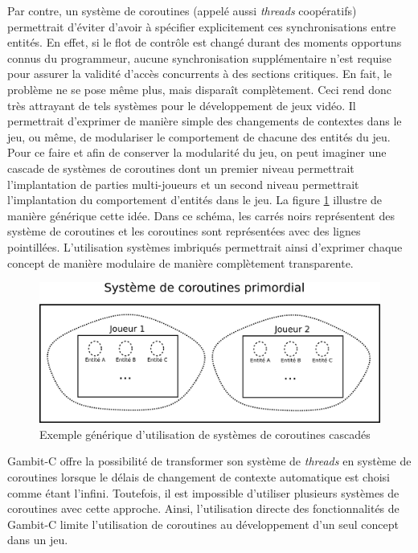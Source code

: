 \documentclass[12pt,twoside,letterpaper,francais]{book}
\begin{document}
Par contre, un système de coroutines (appelé aussi \textit{threads}
coopératifs) permettrait d'éviter d'avoir à spécifier explicitement
ces synchronisations entre entités. En effet, si le flot de contrôle
est changé durant des moments opportuns connus du programmeur, aucune
synchronisation supplémentaire n'est requise pour assurer la validité
d'accès concurrents à des sections critiques. En fait, le problème ne
se pose même plus, mais disparaît complètement. Ceci rend donc très
attrayant de tels systèmes pour le développement de jeux vidéo. Il
permettrait d'exprimer de manière simple des changements de contextes
dans le jeu, ou même, de modulariser le comportement de chacune des
entités du jeu. Pour ce faire et afin de conserver la modularité du
jeu, on peut imaginer une cascade de systèmes de coroutines dont un
premier niveau permettrait l'implantation de parties multi-joueurs et
un second niveau permettrait l'implantation du comportement d'entités
dans le jeu. La figure \ref{Corout:usecase} illustre de manière
générique cette idée. Dans ce schéma, les carrés noirs représentent
des système de coroutines et les coroutines sont représentées avec des
lignes pointillées. L'utilisation systèmes imbriqués permettrait ainsi
d'exprimer chaque concept de manière modulaire de manière complètement
transparente.

\begin{figure}[htb!]
  \center
  \includegraphics[scale=1.2]{corout-usecase-design}
  \caption{Exemple générique d'utilisation de systèmes de coroutines
    cascadés}
  \label{Corout:usecase}
\end{figure}

Gambit-C offre la possibilité de transformer son système de
\textit{threads} en système de coroutines lorsque le délais de
changement de contexte automatique est choisi comme étant
l'infini. Toutefois, il est impossible d'utiliser plusieurs systèmes
de coroutines avec cette approche. Ainsi, l'utilisation directe des
fonctionnalités de Gambit-C limite l'utilisation de coroutines au
développement d'un seul concept dans un jeu.
\end{document}
